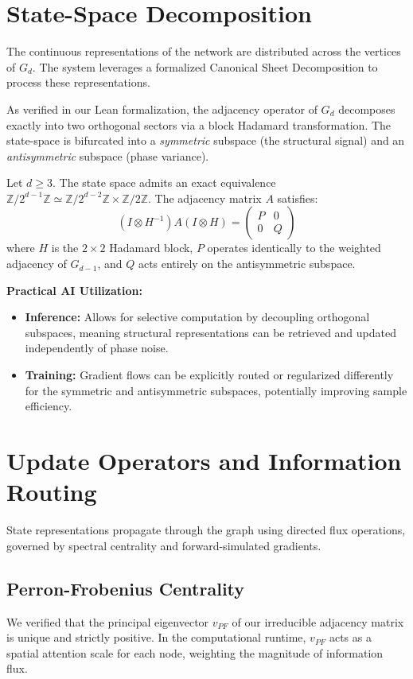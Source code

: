 \documentclass[11pt,a4paper]{article}
\begin{document}
\section{State-Space Decomposition}
The continuous representations of the network are distributed across the vertices of $G_d$. The system leverages a formalized Canonical Sheet Decomposition to process these representations.

As verified in our Lean formalization, the adjacency operator of $G_d$ decomposes exactly into two orthogonal sectors via a block Hadamard transformation. The state-space is bifurcated into a \textit{symmetric} subspace (the structural signal) and an \textit{antisymmetric} subspace (phase variance). 

\begin{theorem}
Let $d \ge 3$. The state space admits an exact equivalence $\mathbb{Z}/2^{d-1}\mathbb{Z} \simeq \mathbb{Z}/2^{d-2}\mathbb{Z} \times \mathbb{Z}/2\mathbb{Z}$. The adjacency matrix $A$ satisfies:
\[
(I \otimes H^{-1}) A (I \otimes H) = \begin{pmatrix} P & 0 \\ 0 & Q \end{pmatrix}
\]
where $H$ is the $2 \times 2$ Hadamard block, $P$ operates identically to the weighted adjacency of $G_{d-1}$, and $Q$ acts entirely on the antisymmetric subspace.
\end{theorem}

\textbf{Practical AI Utilization:}
\begin{itemize}
    \item \textbf{Inference:} Allows for selective computation by decoupling orthogonal subspaces, meaning structural representations can be retrieved and updated independently of phase noise.
    \item \textbf{Training:} Gradient flows can be explicitly routed or regularized differently for the symmetric and antisymmetric subspaces, potentially improving sample efficiency.
\end{itemize}

\section{Update Operators and Information Routing}
State representations propagate through the graph using directed flux operations, governed by spectral centrality and forward-simulated gradients.

\subsection{Perron-Frobenius Centrality}
We verified that the principal eigenvector $v_{PF}$ of our irreducible adjacency matrix is unique and strictly positive. In the computational runtime, $v_{PF}$ acts as a spatial attention scale for each node, weighting the magnitude of information flux.
\end{document}
